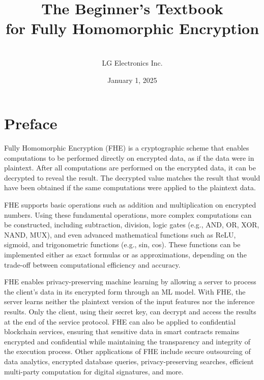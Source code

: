 \documentclass[11pt]{article}
\begin{document}
\title{\Huge{\textbf{The Beginner's Textbook}}\\ \Huge{\textbf{for Fully Homomorphic Encryption}}}
\author{\textbf{}\\{LG Electronics Inc.}}%
\date{January 1, 2025}



\begin{titlingpage}
\maketitle
\end{titlingpage}


\clearpage

\section*{Preface}
Fully Homomorphic Encryption (FHE) is a cryptographic scheme that enables computations to be performed directly on encrypted data, as if the data were in plaintext. After all computations are performed on the encrypted data, it can be decrypted to reveal the result. The decrypted value matches the result that would have been obtained if the same computations were applied to the plaintext data.

FHE supports basic operations such as addition and multiplication on encrypted numbers. Using these fundamental operations, more complex computations can be constructed, including subtraction, division, logic gates (e.g., AND, OR, XOR, NAND, MUX), and even advanced mathematical functions such as ReLU, sigmoid, and trigonometric functions (e.g., sin, cos). These functions can be implemented either as exact formulas or as approximations, depending on the trade-off between computational efficiency and accuracy. 

FHE enables privacy-preserving machine learning by allowing a server to process the client’s data in its encrypted form through an ML model. With FHE, the server learns neither the plaintext version of the input features nor the inference results. Only the client, using their secret key, can decrypt and access the results at the end of the service protocol.
FHE can also be applied to confidential blockchain services, ensuring that sensitive data in smart contracts remains encrypted and confidential while maintaining the transparency and integrity of the execution process.
Other applications of FHE include secure outsourcing of data analytics, encrypted database queries, privacy-preserving searches, efficient multi-party computation for digital signatures, and more.
\end{document}
